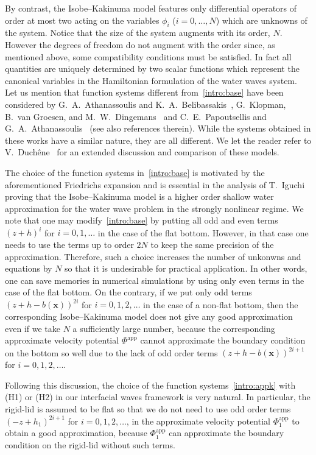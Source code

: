 \documentclass[11pt,leqno]{article}
\numberwithin{equation}{section}
\numberwithin{figure}{section}
\begin{document}
By contrast, the Isobe--Kakinuma model features only differential operators of order at most two acting on the variables $\phi_{i}$ ($i=0,\dots,N$) which are unknowns of the system. Notice that the size of the system augments with its order, $N$. However the degrees of freedom do not augment with the order since, as mentioned above, some compatibility conditions must be satisfied. In fact all quantities are uniquely determined by two scalar functions which represent the canonical variables in the Hamiltonian formulation of the water waves system.
Let us mention that function systems different from~\eqref{intro:base} have been considered by G.~A.~Athanassoulis and K.~A.~Belibassakis~\cite{AthanassoulisBelibassakis99}, G.~Klopman, B.~van Groesen, and M.~W.~Dingemans~\cite{KlopmanGroesenDingemans10} and C.~E.~Papoutsellis and G.~A.~Athanassoulis~\cite{PapoutsellisAthanassoulis17} (see also references therein). 
While the systems obtained in these works have a similar nature, they are all different. 
We let the reader refer to V.~Duchêne~\cite[Chapter~D]{MM4WW} for an extended discussion and comparison of these models. 

The choice of the function systems in~\eqref{intro:base} is motivated by the aforementioned Friedrichs expansion and is essential in the analysis of 
T.~Iguchi~\cite{Iguchi2018-1,Iguchi2018-2} proving that the Isobe--Kakinuma model is a higher order shallow water approximation for the water wave problem 
in the strongly nonlinear regime. 
We note that one may modify~\eqref{intro:base} by putting all odd and even terms $(z+h)^{i}$ for $i=0,1,\ldots$ in the case of the flat bottom. 
However, in that case one needs to use the terms up to order $2N$ to keep the same precision of the approximation. 
Therefore, such a choice increases the number of unkonwns and equations by $N$ so that it is undesirable for practical application. 
In other words, one can save memories in numerical simulations by using only even terms in the case of the flat bottom. 
On the contrary, if we put only odd terms $(z+h-b(\bm{x}))^{2i}$ for $i=0,1,2,\ldots$ in the case of a non-flat bottom, 
then the corresponding Isobe--Kakinuma model does not give any good approximation even if we take $N$ a sufficiently large number, 
because the corresponding approximate velocity potential $\Phi^\mathrm{app}$ cannot approximate the boundary condition on the bottom so well 
due to the lack of odd order terms $(z+h-b(\bm{x}))^{2i+1}$ for $i=0,1,2,\ldots$. 


Following this discussion, the choice of the function systems~\eqref{intro:appk} with (H1) or (H2) in our interfacial waves framework is very natural. 
In particular, the rigid-lid is assumed to be flat so that we do not need to use odd order terms $(-z+h_1)^{2i+1}$ for $i=0,1,2,\ldots$, 
in the approximate velocity potential $\Phi_1^\mathrm{app}$ to obtain a good approximation, 
because $\Phi_1^\mathrm{app}$ can approximate the boundary condition on the rigid-lid without such terms. 
\end{document}
